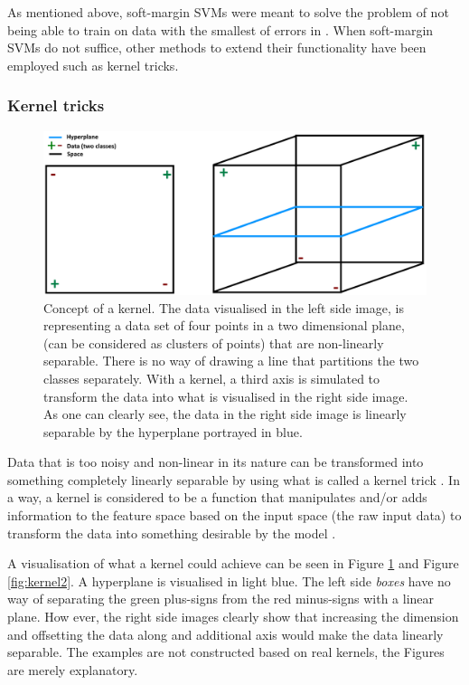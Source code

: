 \documentclass[a4paper,twoside]{bth}
\begin{document}
As mentioned above, soft-margin SVMs were meant to solve the problem of not being able to train on data with the smallest of errors in \cite{Cortes:1995:SN:218919.218929}. When soft-margin SVMs do not suffice, other methods to extend their functionality have been employed such as kernel tricks.

\subsubsection{Kernel tricks}
\begin{figure}
\centering
\includegraphics[scale=0.35]{images/dimred_images/kernel2d3dplane2.png}
   \caption{Concept of a kernel. The data visualised in the left side image, is representing a data set of four points in a two dimensional plane, (can be considered as clusters of points) that are non-linearly separable. There is no way of drawing a line that partitions the two classes separately. With a kernel, a third axis is simulated to transform the data into what is visualised in the right side image. As one can clearly see, the data in the right side image is linearly separable by the hyperplane portrayed in blue.}
   \label{fig:kernel}
\end{figure}

\par Data that is too noisy and non-linear in its nature can be transformed into something completely linearly separable by using what is called a kernel trick \cite{Flach:2012:MLA:2490546}. In a way, a kernel is considered to be a function that manipulates and/or adds information to the feature space based on the input space (the raw input data) to transform the data into something desirable by the model \cite{Flach:2012:MLA:2490546}.

\par A visualisation of what a kernel could achieve can be seen in Figure \ref{fig:kernel} and Figure \ref{fig:kernel2}. A hyperplane is visualised in light blue. The left side \textit{boxes} have no way of separating the green plus-signs from the red minus-signs with a linear plane. How ever, the right side images clearly show that increasing the dimension and offsetting the data along and additional axis would make the data linearly separable. The examples are not constructed based on real kernels, the Figures are merely explanatory.
\end{document}
